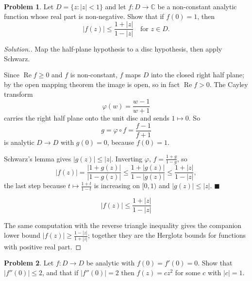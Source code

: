 \documentclass[11pt,a4paper]{article}
\theoremstyle{definition}
\newtheorem{problemx}{Problem}[section]
\newenvironment{problem}{\begin{problemx}}{\end{problemx}}
\newenvironment{solution}
  {\renewcommand{\qedsymbol}{}\begin{proof}[\textit{Solution}.]}
  {\end{proof}}
\begin{document}
\begin{problem}
Let $D = \{z : \left|z\right| < 1\}$ and let $f : D \rightarrow \mathbb{C}$ be a
non-constant analytic function whose real part is non-negative. Show that if
$f(0) = 1$, then
$$\left|f(z)\right| \leq \frac{1 + \left|z\right|}{1 - \left|z\right|}
\quad \text{for } z \in D.$$
\end{problem}

\begin{solution}
Map the half-plane hypothesis to a disc hypothesis, then apply Schwarz.

Since $\operatorname{Re}f \geq 0$ and $f$ is non-constant, $f$ maps $D$ into the
closed right half plane; by the open mapping theorem the image is open, so in fact
$\operatorname{Re}f > 0$. The Cayley transform
$$\varphi(w) = \frac{w-1}{w+1}$$
carries the right half plane onto the unit disc and sends $1 \mapsto 0$. So
$$g = \varphi \circ f = \frac{f-1}{f+1}$$
is analytic $D \rightarrow D$ with $g(0) = 0$, because $f(0) = 1$.

Schwarz's lemma gives $\left|g(z)\right| \leq \left|z\right|$. Inverting
$\varphi$, $f = \frac{1+g}{1-g}$, so
$$\left|f(z)\right| = \frac{\left|1+g(z)\right|}{\left|1-g(z)\right|}
\leq \frac{1+\left|g(z)\right|}{1-\left|g(z)\right|}
\leq \frac{1+\left|z\right|}{1-\left|z\right|},$$
the last step because $t \mapsto \frac{1+t}{1-t}$ is increasing on $[0,1)$ and
$\left|g(z)\right| \leq \left|z\right|$. $\blacksquare$

$$\boxed{\left|f(z)\right| \leq \frac{1+\left|z\right|}{1-\left|z\right|}}$$

The same computation with the reverse triangle inequality gives the companion lower
bound $\left|f(z)\right| \geq \frac{1-\left|z\right|}{1+\left|z\right|}$; together
they are the Herglotz bounds for functions with positive real part.
\end{solution}


\begin{problem}
Let $f : D \rightarrow D$ be analytic with $f(0) = f'(0) = 0$. Show that
$\left|f''(0)\right| \leq 2$, and that if $\left|f''(0)\right| = 2$ then
$f(z) = cz^{2}$ for some $c$ with $\left|c\right| = 1$.
\end{problem}
\end{document}
